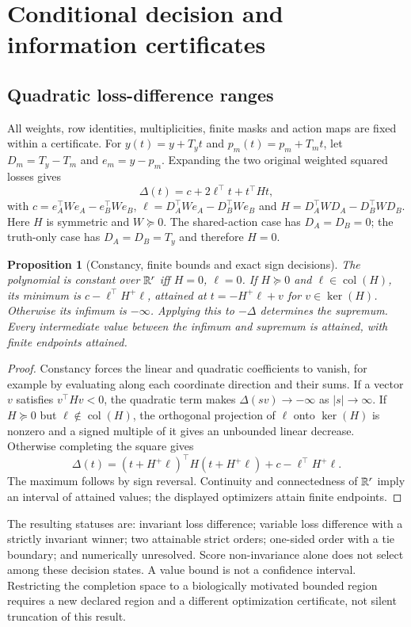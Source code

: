 \documentclass[11pt]{article}
\newtheorem{proposition}{Proposition}
\begin{document}
\section{Conditional decision and information certificates}


\subsection{Quadratic loss-difference ranges}
All weights, row identities, multiplicities, finite masks and action maps are fixed within a certificate. For $y(t)=y+T_yt$ and $p_m(t)=p_m+T_mt$, let $D_m=T_y-T_m$ and $e_m=y-p_m$. Expanding the two original weighted squared losses gives
\[
\Delta(t)=c+2\ell^\top t+t^\top Ht,
\]
with $c=e_A^\top We_A-e_B^\top We_B$, $\ell=D_A^\top We_A-D_B^\top We_B$ and $H=D_A^\top WD_A-D_B^\top WD_B$. Here $H$ is symmetric and $W\succeq0$. The shared-action case has $D_A=D_B=0$; the truth-only case has $D_A=D_B=T_y$ and therefore $H=0$.

\begin{proposition}[Constancy, finite bounds and exact sign decisions]
The polynomial is constant over $\mathbb{R}^r$ iff $H=0$, $\ell=0$. If $H\succeq0$ and $\ell\in\operatorname{col}(H)$, its minimum is $c-\ell^\top H^+\ell$, attained at $t=-H^+\ell+v$ for $v\in\ker(H)$. Otherwise its infimum is $-\infty$. Applying this to $-\Delta$ determines the supremum. Every intermediate value between the infimum and supremum is attained, with finite endpoints attained.
\end{proposition}
\begin{proof}
Constancy forces the linear and quadratic coefficients to vanish, for example by evaluating along each coordinate direction and their sums. If a vector $v$ satisfies $v^\top Hv<0$, the quadratic term makes $\Delta(sv)\to-\infty$ as $|s|\to\infty$. If $H\succeq0$ but $\ell\notin\operatorname{col}(H)$, the orthogonal projection of $\ell$ onto $\ker(H)$ is nonzero and a signed multiple of it gives an unbounded linear decrease. Otherwise completing the square gives
\[
\Delta(t)=(t+H^+\ell)^\top H(t+H^+\ell)+c-\ell^\top H^+\ell.
\]
The maximum follows by sign reversal. Continuity and connectedness of $\mathbb{R}^r$ imply an interval of attained values; the displayed optimizers attain finite endpoints.
\end{proof}
The resulting statuses are: invariant loss difference; variable loss difference with a strictly invariant winner; two attainable strict orders; one-sided order with a tie boundary; and numerically unresolved. Score non-invariance alone does not select among these decision states. A value bound is not a confidence interval. Restricting the completion space to a biologically motivated bounded region requires a new declared region and a different optimization certificate, not silent truncation of this result.
\end{document}
